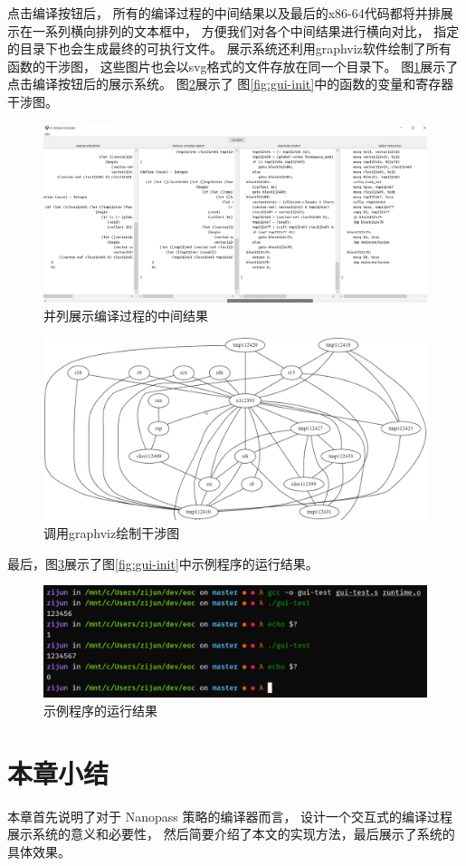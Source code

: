 点击编译按钮后，
所有的编译过程的中间结果以及最后的x86-64代码都将并排展示在一系列横向排列的文本框中，
方便我们对各个中间结果进行横向对比，
指定的目录下也会生成最终的可执行文件。
展示系统还利用graphviz软件绘制了所有函数的干涉图，
这些图片也会以svg格式的文件存放在同一个目录下。
图\ref{fig:gui-compile}展示了点击编译按钮后的展示系统。
图\ref{fig:gui-interf-graph}展示了
图\ref{fig:gui-init}中的函数的变量和寄存器干涉图。

\begin{figure}[h]
\centering
\includegraphics[width=\textwidth]{figures/gui-compile.png}
\caption{并列展示编译过程的中间结果}
\label{fig:gui-compile}
\end{figure}

\begin{figure}[h]
\centering
\includegraphics[width=\textwidth]{figures/gui-interf-graph.png}
\caption{调用graphviz绘制干涉图}
\label{fig:gui-interf-graph}
\end{figure}

最后，图\ref{fig:gui-result}展示了图\ref{fig:gui-init}中示例程序的运行结果。

\begin{figure}[h]
\centering
\includegraphics[width=\textwidth]{figures/gui-result.png}
\caption{示例程序的运行结果}
\label{fig:gui-result}
\end{figure}


\section{本章小结}

本章首先说明了对于 Nanopass 策略的编译器而言，
设计一个交互式的编译过程展示系统的意义和必要性，
然后简要介绍了本文的实现方法，最后展示了系统的具体效果。

